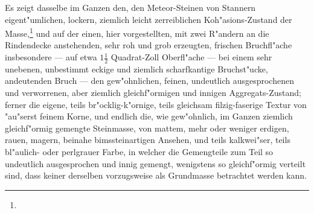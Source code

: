 \documentclass[a4paper, 11pt, oneside, german]{article}
\begin{document}
Es zeigt dasselbe im Ganzen den, den Meteor-Steinen von Stannern eigent"umlichen, lockern, ziemlich leicht zerreiblichen Koh"asions-Zustand der Masse,\footnote{} und auf der einen, hier vorgestellten, mit zwei R"andern an die Rindendecke anstehenden, sehr roh und grob erzeugten, frischen Bruchfl"ache insbesondere --- auf etwa $1\frac{1}{2}$ Quadrat-Zoll Oberfl"ache --- bei einem sehr unebenen, unbestimmt eckige und ziemlich scharfkantige Bruchst"ucke, andeutenden Bruch --- den gew"ohnlichen, feinen, undeutlich ausgesprochenen und verworrenen, aber ziemlich gleichf"ormigen und innigen Aggregats-Zustand; ferner die eigene, teils br"ocklig-k"ornige, teils gleichsam filzig-faserige Textur von "au"serst feinem Korne, und endlich die, wie gew"ohnlich, im Ganzen ziemlich gleichf"ormig gemengte Steinmasse, von mattem, mehr oder weniger erdigen, rauen, magern, beinahe bimssteinartigen Ansehen, und teils kalkwei"ser, teils bl"aulich- oder perlgrauer Farbe, in welcher die Gemengteile zum Teil so undeutlich ausgesprochen und innig gemengt, wenigstens so gleichf"ormig verteilt sind, dass keiner derselben vorzugsweise als Grundmasse betrachtet werden kann.
\end{document}

